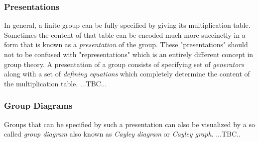 
\subsubsection{Presentations}

In general, a finite group can be fully specified by giving its multiplication table. Sometimes the content of that table can be encoded much more succinctly in a form that is known as a \emph{presentation} of the group. These "presentations" should not to be confused with "representations" which is an entirely different concept in group theory. A presentation of a group consists of specifying set of \emph{generators} along with a set of \emph{defining equations} which completely determine the content of the multiplication table. ...TBC...


\subsubsection{Group Diagrams}
Groups that can be specified by such a presentation can also be visualized by a so called \emph{group diagram} also known as \emph{Cayley diagram} or \emph{Cayley graph}. ...TBC..

